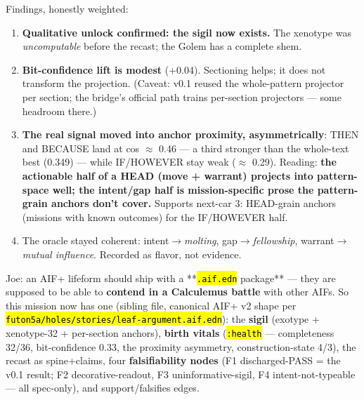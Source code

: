 \documentclass[11pt,oneside]{article}
\newcommand{\scopehl}[1]{\texttt{\hl{#1}}}
\begin{document}
\begin{phasebox}[title={3. DERIVE --- opened with a candidate runner (2026-06-10)}]
\begin{subbox}[title={3.3.1 v0.1 RESULT --- the Golemization run (2026-06-10)}]
Findings, honestly weighted:
\begin{enumerate}[leftmargin=1.4em,itemsep=1pt]
\item \textbf{Qualitative unlock confirmed: the sigil now exists.} The xenotype was \emph{uncomputable} before the recast; the Golem has a complete shem.
\item \textbf{Bit-confidence lift is modest} (+0.04). Sectioning helps; it does not transform the projection. (Caveat: v0.1 reused the whole-pattern projector per section; the bridge's official path trains per-section projectors --- some headroom there.)
\item \textbf{The real signal moved into anchor proximity, asymmetrically}: THEN and BECAUSE land at cos $\approx$ 0.46 --- a third stronger than the whole-text best (0.349) --- while IF/HOWEVER stay weak ($\approx$ 0.29). Reading: \textbf{the actionable half of a HEAD (move + warrant) projects into pattern-space well; the intent/gap half is mission-specific prose the pattern-grain anchors don't cover.} Supports next-car 3: HEAD-grain anchors (missions with known outcomes) for the IF/HOWEVER half.
\item The oracle stayed coherent: intent$\rightarrow$\emph{molting}, gap$\rightarrow$\emph{fellowship}, warrant$\rightarrow$\emph{mutual influence}. Recorded as flavor, not evidence.
\end{enumerate}

\end{subbox}
\begin{subbox}[title={3.3.2 The lifeform package: \scopehl{E-mission-head.aif.edn} (2026-06-10)}]

Joe: an AIF+ lifeform should ship with a **\scopehl{.aif.edn} package** --- they are
supposed to be able to \textbf{contend in a Calculemus battle} with other AIFs. So
this mission now has one (sibling file, canonical AIF+ v2 shape per
\scopehl{futon5a/holes/stories/leaf-argument.aif.edn}): the \textbf{sigil} (exotype +
xenotype-32 + per-section anchors), \textbf{birth vitals} (\scopehl{:health} --- completeness
32/36, bit-confidence 0.33, the proximity asymmetry, construction-state 4/3),
the recast as spine+claims, four \textbf{falsifiability nodes} (F1 discharged-PASS
= the v0.1 result; F2 decorative-readout, F3 uninformative-sigil, F4
intent-not-typeable --- all spec-only), and support/falsifies edges.


\end{subbox}
\end{phasebox}
\end{document}
